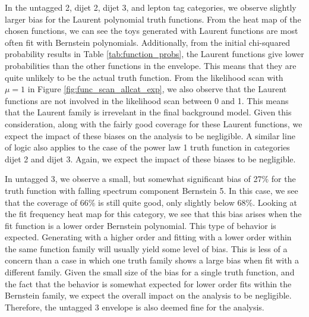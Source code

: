 In the untagged 2, dijet 2, dijet 3, and lepton tag categories, we observe slightly larger bias for the Laurent polynomial truth functions. 
From the heat map of the chosen functions, we can see the toys generated with Laurent functions are most often fit with 
Bernstein polynomials. Additionally, from the initial chi-squared probability results in Table \ref{tab:function_probs}, 
the Laurent functions give lower probabilities than the other functions in the envelope. 
This means that they are quite unlikely to be the actual truth function. From the likelihood scan with $\mu=1$ in 
Figure \ref{fig:func_scan_allcat_exp}, we also observe that the Laurent functions are not involved in the likelihood scan between 0 and 1.
This means that the Laurent family is irrevelant in the final background model. 
Given this consideration, along with the fairly good coverage for these 
Laurent functions, we expect the impact of these biases on the analysis to be negligible. A similar line of logic also applies to the 
case of the power law 1 truth function in categories dijet 2 and dijet 3. Again, we expect the impact of these biases to be negligible.

In untagged 3, we observe a small, but somewhat significant bias of 27\% for the truth function with falling spectrum
component Bernstein 5. In this case, we see that the coverage of 66\% is still quite good, only slightly below 68\%. 
Looking at the fit frequency heat map for this category, we see that this bias arises when the fit function is a 
lower order Bernstein polynomial. This type of behavior is expected. Generating with a higher order and fitting with a lower 
order within the same function family will usually yield some level of bias. This is less of a concern than a case in which one 
truth family shows a large bias when fit with a different family. Given the small size of the bias for a single truth 
function, and the fact that the behavior is somewhat expected for lower order fits within the Bernstein family, we expect 
the overall impact on the analysis to be negligible. Therefore, the untagged 3 envelope is also deemed fine for the analysis. 

